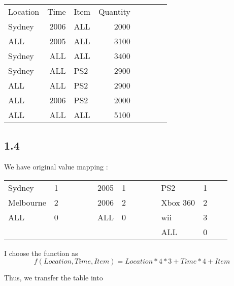 \documentclass[a4paper,12pt]{article}
\begin{document}
\begin{Large}
\begin{center}
\begin{tabular}{lrlrlrlr}
Location &  Time &  Item &  Quantity \\

Sydney &  2006 &       ALL &    2000 \\
ALL &   2005 &       ALL &    3100 \\
Sydney &   ALL &       ALL &     3400 \\
Sydney &   ALL &       PS2 &    2900 \\
ALL &   ALL &       PS2 &    2900 \\
ALL &   2006 &       PS2 &    2000 \\
ALL &   ALL &       ALL &    5100\\

\end{tabular}
\end{center}
\end{Large}

\subsection*{1.4}

We have original value mapping :\\
\begin{large}
\begin{center}
\begin{tabular}{llrllrll}

Sydney & 1   &  2005 & 1  &  PS2 & 1\\
Melbourne & 2 \ \ \ \ \ \ \ & 2006 & 2 \ \ \ \ \ \ &  Xbox 360 & 2\\
ALL & 0  &   ALL  & 0  &  wii & 3\\
 {} &{} & {} & {} & ALL & 0   \\

\end{tabular}
\end{center}
\end{large}


I choose the function as \\
$$ f(Location, Time, Item) = Location * 4 * 3 + Time * 4 + Item $$



Thus, we transfer the table into\\
\end{document}
